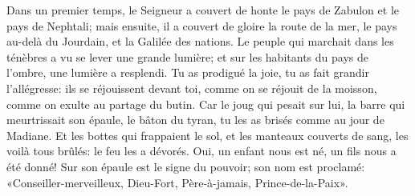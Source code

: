 Dans un premier temps,
	le Seigneur a couvert de honte le pays de Zabulon et le pays de Nephtali;
	mais ensuite, il a couvert de gloire la route de la mer,
	le pays au-delà du Jourdain, et la Galilée des nations.
Le peuple qui marchait dans les ténèbres a vu se lever une grande lumière;
	et sur les habitants du pays de l’ombre, une lumière a resplendi.
Tu as prodigué la joie, tu as fait grandir l’allégresse:
	ils se réjouissent devant toi,
	comme on se réjouit de la moisson, comme on exulte au partage du butin.
Car le joug qui pesait sur lui, la barre qui meurtrissait son épaule, le bâton du tyran,
	tu les as brisés comme au jour de Madiane.
Et les bottes qui frappaient le sol, et les manteaux couverts de sang,
	les voilà tous brûlés: le feu les a dévorés.
Oui, un enfant nous est né, un fils nous a été donné!
	Sur son épaule est le signe du pouvoir;
	son nom est proclamé:
	«Conseiller-merveilleux, Dieu-Fort, Père-à-jamais, Prince-de-la-Paix».
